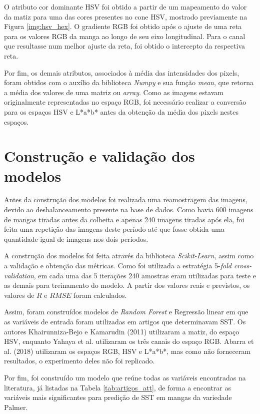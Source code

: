 O atributo cor dominante HSV foi obtido a partir de um mapeamento do valor da matiz para uma das cores presentes no cone HSV, mostrado previamente na Figura \ref{img:hsv_hex}. O gradiente RGB foi obtido após o ajuste de uma reta para os valores RGB da manga ao longo de seu eixo longitudinal. Para o canal que resultasse num melhor ajuste da reta, foi obtido o intercepto da respectiva reta. 

Por fim, os demais atributos, associados à média das intensidades dos pixels, foram obtidos com o auxílio da biblioteca \textit{Numpy} e sua função \textit{mean}, que retorna a média dos valores de uma matriz ou \textit{array}. Como as imagens estavam originalmente representadas no espaço RGB, foi necessário realizar a conversão para os espaços HSV e L*a*b* antes da obtenção da média dos pixels nestes espaços.

\section{Construção e validação dos modelos}

Antes da construção dos modelos foi realizada uma reamostragem das imagens, devido ao desbalanceamento presente na base de dados. Como havia 600 imagens de mangas tiradas antes da colheita e apenas 240 imagens tiradas após ela, foi feita uma repetição das imagens deste período até que fosse obtida uma quantidade igual de imagens nos dois períodos.

A construção dos modelos foi feita através da biblioteca \textit{Scikit-Learn}, assim como a validação e obtenção das métricas. Como foi utilizada a estratégia 5-\textit{fold cross-validation}, em cada uma das 5 iterações 240 amostras eram utilizadas para teste e as demais para treinamento do modelo. A partir dos valores reais e previstos, os valores de $R$ e $RMSE$ foram calculados.

Assim, foram construídos modelos de \textit{Random Forest} e Regressão linear em que as variáveis de entrada foram utilizadas em artigos que determinavam SST. Os autores Khairunniza-Bejo e Kamarudin (2011) utilizaram a matiz, do espaço HSV, enquanto Yahaya et al. utilizaram os três canais do espaço RGB. Abarra et al. (2018) utilizaram os espaços RGB, HSV e L*a*b*, mas como não forneceram resultados, o experimento deles não foi replicado. 

Por fim, foi construído um modelo que reúne todas as variáveis encontradas na literatura, já listadas na Tabela \ref{tab:artigos_att}, de forma a encontrar as variáveis mais significantes para predição de SST em mangas da variedade Palmer.

